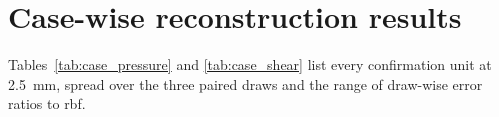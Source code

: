 \documentclass[12pt,a4paper]{article}
\newcommand{\RBF}{\ac{rbf}\xspace}
\theoremstyle{definition}
\numberwithin{equation}{section}
\begin{document}
\appendix
\section{Case-wise reconstruction results}
\label{app:casewise}
Tables~\ref{tab:case_pressure} and \ref{tab:case_shear} list every confirmation unit at 2.5~mm, spread over the three paired draws and the range of draw-wise error ratios to \RBF.




\newpage


\end{document}
